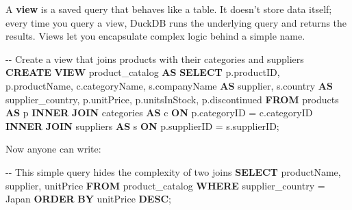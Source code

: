 \documentclass[
  letterpaper,
  DIV=11,
  numbers=noendperiod]{scrreprt}
\newenvironment{Shaded}{\begin{snugshade}}{\end{snugshade}}
\newcommand{\CommentTok}[1]{\textcolor[rgb]{0.37,0.37,0.37}{#1}}
\newcommand{\KeywordTok}[1]{\textcolor[rgb]{0.00,0.23,0.31}{\textbf{#1}}}
\newcommand{\NormalTok}[1]{\textcolor[rgb]{0.00,0.23,0.31}{#1}}
\newcommand{\OperatorTok}[1]{\textcolor[rgb]{0.37,0.37,0.37}{#1}}
\newcommand{\StringTok}[1]{\textcolor[rgb]{0.13,0.47,0.30}{#1}}
\begin{document}
A \textbf{view} is a saved query that behaves like a table. It doesn't
store data itself; every time you query a view, DuckDB runs the
underlying query and returns the results. Views let you encapsulate
complex logic behind a simple name.

\begin{codelisting}

\caption{\texttt{duckdb}}

\begin{Shaded}
\begin{Highlighting}[]
\CommentTok{{-}{-} Create a view that joins products with their categories and suppliers}
\KeywordTok{CREATE} \KeywordTok{VIEW}\NormalTok{ product\_catalog }\KeywordTok{AS}
\KeywordTok{SELECT}
\NormalTok{    p.productID,}
\NormalTok{    p.productName,}
\NormalTok{    c.categoryName,}
\NormalTok{    s.companyName }\KeywordTok{AS}\NormalTok{ supplier,}
\NormalTok{    s.country }\KeywordTok{AS}\NormalTok{ supplier\_country,}
\NormalTok{    p.unitPrice,}
\NormalTok{    p.unitsInStock,}
\NormalTok{    p.discontinued}
\KeywordTok{FROM}\NormalTok{ products }\KeywordTok{AS}\NormalTok{ p}
\KeywordTok{INNER} \KeywordTok{JOIN}\NormalTok{ categories }\KeywordTok{AS}\NormalTok{ c }\KeywordTok{ON}\NormalTok{ p.categoryID }\OperatorTok{=}\NormalTok{ c.categoryID}
\KeywordTok{INNER} \KeywordTok{JOIN}\NormalTok{ suppliers }\KeywordTok{AS}\NormalTok{ s }\KeywordTok{ON}\NormalTok{ p.supplierID }\OperatorTok{=}\NormalTok{ s.supplierID;}
\end{Highlighting}
\end{Shaded}

\end{codelisting}

Now anyone can write:

\begin{codelisting}

\caption{\texttt{duckdb}}

\begin{Shaded}
\begin{Highlighting}[]
\CommentTok{{-}{-} This simple query hides the complexity of two joins}
\KeywordTok{SELECT}
\NormalTok{    productName,}
\NormalTok{    supplier,}
\NormalTok{    unitPrice}
\KeywordTok{FROM}\NormalTok{ product\_catalog}
\KeywordTok{WHERE}\NormalTok{ supplier\_country }\OperatorTok{=} \StringTok{\textquotesingle{}Japan\textquotesingle{}}
\KeywordTok{ORDER} \KeywordTok{BY}\NormalTok{ unitPrice }\KeywordTok{DESC}\NormalTok{;}
\end{Highlighting}
\end{Shaded}

\end{codelisting}
\end{document}
